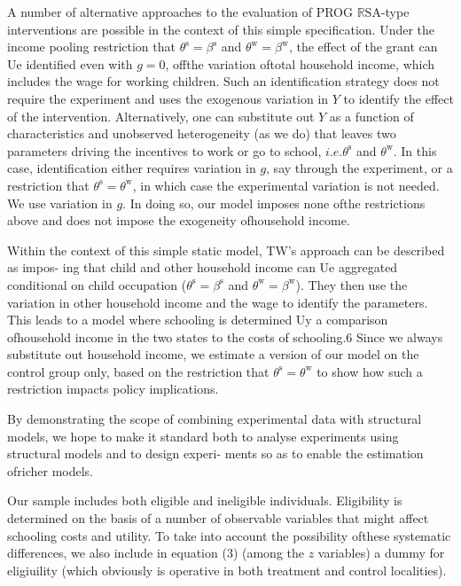 A number of alternative approaches to the evaluation of PROG $\mathbb{R}\mathrm{S}\mathrm{A}$-type interventions are possible in the context of this simple specification. Under the income pooling restriction that $\theta^{\mathrm{s}}=\beta^{\mathrm{s}}$ and $\theta^{\mathrm{w}}=\beta^{\mathrm{w}}$, the effect of the grant can Ue identified even with $g=0$, offthe variation oftotal household income, which includes the wage for working children. Such an identification strategy does not require the experiment and uses the exogenous variation in $Y$ to identify the effect of the intervention. Alternatively, one can substitute out $Y$ as a function of characteristics and unobserved heterogeneity (as we do) that leaves two parameters driving the incentives to work or go to school, $i.e. \theta^{\mathrm{s}}$ and $\theta^{\mathrm{w}}$. In this case, identification either requires variation in $g$, say through the experiment, or a restriction that $\theta^{\mathrm{s}}=\theta^{\mathrm{w}}$, in which case the experimental variation is not needed. We use variation in $g$. In doing so, our model imposes none ofthe restrictions above and does not impose the exogeneity ofhousehold income.

Within the context of this simple static model, TW's approach can be described as impos- ing that child and other household income can Ue aggregated conditional on child occupation ($\theta^{\mathrm{s}}=\beta^{\mathrm{s}}$ and $\theta^{\mathrm{w}}=\beta^{\mathrm{w}}$). They then use the variation in other household income and the wage to identify the parameters. This leads to a model where schooling is determined Uy a comparison ofhousehold income in the two states to the costs of schooling.6 Since we always substitute out household income, we estimate a version of our model on the control group only, based on the restriction that $\theta^{\mathrm{s}}=\theta^{\mathrm{w}}$ to show how such a restriction impacts policy implications.

By demonstrating the scope of combining experimental data with structural models, we hope to make it standard both to analyse experiments using structural models and to design experi- ments so as to enable the estimation ofricher models.

Our sample includes both eligible and ineligible individuals. Eligibility is determined on the basis of a number of observable variables that might affect schooling costs and utility. To take into account the possibility ofthese systematic differences, we also include in equation (3) (among the $z$ variables) a dummy for eligiuility (which obviously is operative in both treatment and control localities).

